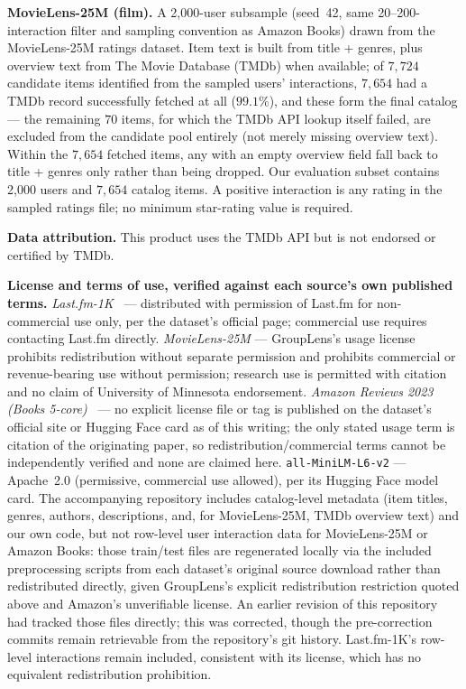 \documentclass[11pt,a4paper]{article}
\begin{document}
\textbf{MovieLens-25M (film).} A 2{,}000-user subsample (seed~42, same
20--200-interaction filter and sampling convention as Amazon Books) drawn
from the MovieLens-25M ratings dataset. Item text is built from title +
genres, plus overview text from The Movie Database (TMDb) when available;
of $7{,}724$ candidate items identified from the sampled users'
interactions, $7{,}654$ had a TMDb record successfully fetched at all
($99.1\%$), and these form the final catalog --- the remaining $70$ items,
for which the TMDb API lookup itself failed, are excluded from the
candidate pool entirely (not merely missing overview text). Within the
$7{,}654$ fetched items, any with an empty overview field fall back to
title + genres only rather than being dropped. Our
evaluation subset contains 2{,}000 users and $7{,}654$ catalog items. A
positive interaction is any rating in the sampled ratings file; no minimum
star-rating value is required.

\textbf{Data attribution.} This product uses the TMDb API but is not
endorsed or certified by TMDb.

\textbf{License and terms of use, verified against each source's own
published terms.} \emph{Last.fm-1K}~\cite{celma2010} --- distributed
with permission of Last.fm for non-commercial use only, per the
dataset's official page; commercial use requires contacting Last.fm
directly. \emph{MovieLens-25M} --- GroupLens's usage license prohibits
redistribution without separate permission and prohibits commercial or
revenue-bearing use without permission; research use is permitted with
citation and no claim of University of Minnesota endorsement.
\emph{Amazon Reviews 2023 (Books 5-core)}~\cite{hou2024} --- no explicit
license file or tag is published on the dataset's official site or
Hugging Face card as of this writing; the only stated usage term is
citation of the originating paper, so redistribution/commercial terms
cannot be independently verified and none are claimed here.
\texttt{all-\allowbreak MiniLM-\allowbreak L6-\allowbreak v2} --- Apache~2.0 (permissive, commercial use
allowed), per its Hugging Face model card. The accompanying repository
includes catalog-level metadata (item titles, genres, authors,
descriptions, and, for MovieLens-25M, TMDb overview text) and our own
code, but not row-level user interaction data for MovieLens-25M or
Amazon Books: those train/test files are regenerated locally via the
included preprocessing scripts from each dataset's original source
download rather than redistributed directly, given GroupLens's explicit
redistribution restriction quoted above and Amazon's unverifiable
license. An earlier revision of this repository had tracked those files
directly; this was corrected, though the pre-correction commits remain
retrievable from the repository's git history. Last.fm-1K's row-level
interactions remain included, consistent with its license, which has no
equivalent redistribution prohibition.
\end{document}
